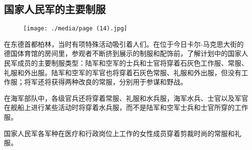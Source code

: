 \subsection{国家人民军的主要制服}

\begin{figure}
\texttt{[image: ./media/page (14).jpg]}
\end{figure}

在东德首都柏林，当时有项特殊活动吸引着人们。在位于今日卡尔-马克思大街的德国体育馆的房间里，参观者不断挤到展示的制服和配饰前，了解计划中的国家人民军成员的主要制服类型：陆军和空军的士兵和士官将穿着石灰色工作服、常服、礼服和外出服。陆军和空军的军官也将穿着石灰色常服、礼服和外出服，但没有工作服；将军还将获得两种改良的常服，分别用于参谋和野战。

在海军部队中，各级官兵还将穿着常服、礼服和水兵服，海军水兵、士官以及军官在舰船上进行某些活动时将穿着水兵服，而不是陆军和空军士兵和士官所穿的工作服。

国家人民军各军种在医疗和行政岗位上工作的女性成员穿着剪裁时尚的常服和礼服。
